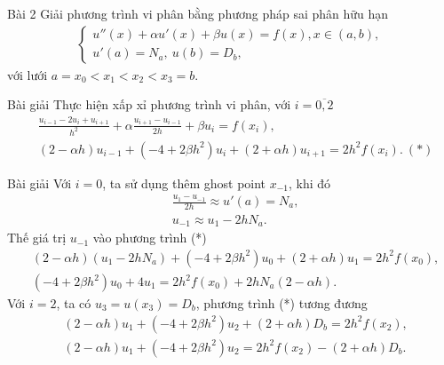 \documentclass[9pt]{beamer}
\begin{document}
\begin{frame}
    \begin{block}{Bài 2}
    Giải phương trình vi phân bằng phương pháp sai phân hữu hạn
    \begin{align*}
        \begin{cases}
        u''(x) + \alpha u'(x) + \beta u(x) = f(x), x \in (a,b), \\
        u'(a) = N_a, \  u(b) = D_b,
        \end{cases}
    \end{align*}
    với lưới $a = x_0 < x_1 < x_2 < x_3 = b$.
    \end{block}
    \begin{exampleblock}{Bài giải}
    Thực hiện xấp xỉ phương trình vi phân, với $i = \overline{0,2}$
    \begin{align*}
        & \frac{u_{i-1} - 2u_i + u_{i+1}}{h^2} + \alpha \frac{u_{i+1} - u_{i-1}}{2h} + \beta u_i = f(x_i), \\
        & (2 - \alpha h) u_{i-1} + (-4 + 2\beta h^2) u_i + (2 + \alpha h) u_{i+1} = 2h^2 f(x_i). \ (*)
    \end{align*}
    \end{exampleblock}
\end{frame}

\begin{frame}
    \begin{exampleblock}{Bài giải}
    Với $i = 0$, ta sử dụng thêm ghost point $x_{-1}$, khi đó
    \begin{align*}
        & \frac{u_1 - u_{-1}}{2h} \approx u'(a) = N_a, \\
        & u_{-1} \approx u_1 - 2hN_a.
    \end{align*}
    Thế giá trị $u_{-1}$ vào phương trình (*)
    \begin{align*}
        & (2 - \alpha h) (u_1 - 2hN_a) + (-4 + 2\beta h^2) u_0 + (2 + \alpha h)u_1 = 2h^2f(x_0), \\
        & (-4 + 2\beta h^2) u_0 + 4u_1 = 2h^2 f(x_0) + 2hN_a(2 - \alpha h).
    \end{align*}
    Với $i = 2$, ta có $u_3 = u(x_3) = D_b$, phương trình (*) tương đương
    \begin{align*}
        & (2 - \alpha h) u_1 + (-4 + 2\beta h^2) u_2 + (2 + \alpha h)D_b = 2h^2f(x_2), \\
        & (2 - \alpha h) u_1 + (-4 + 2\beta h^2) u_2 = 2h^2f(x_2) - (2 + \alpha h)D_b.
    \end{align*}
    \end{exampleblock}
\end{frame}
\end{document}
